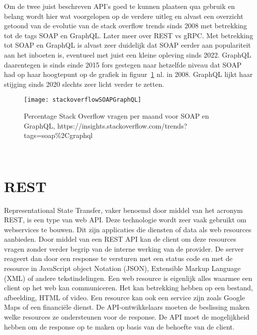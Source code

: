 Om de twee juist beschreven API's goed te kunnen plaatsen qua gebruik en belang wordt hier wat voorgelopen op de verdere uitleg en alvast een overzicht getoond van de evolutie van de
stack overflow trends sinds 2008 met betrekking tot de tags SOAP en GraphQL. Later meer over REST vs gRPC. Met betrekking tot SOAP en GraphQL is alvast zeer duidelijk dat SOAP eerder
aan populariteit aan het inboeten is, eventueel met juist een kleine opleving sinds 2022. GraphQL daarentegen is sinds einde 2015 fors gestegen naar hetzelfde niveau dat SOAP had
op haar hoogtepunt op de grafiek in figuur~\ref{fig:stackoverflowSOAPGraphQL} nl. in 2008. GraphQL lijkt haar stijging sinds 2020 slechts zeer licht verder te zetten.
\begin{figure}[ht]
    \centering
    \texttt{[image: stackoverflowSOAPGraphQL]}
    \caption{Percentage Stack Overflow vragen per maand voor SOAP en GraphQL,\newline
    https://insights.stackoverflow.com/trends?tags=soap\%2Cgraphql}
    \label{fig:stackoverflowSOAPGraphQL}
\end{figure}\\
\nocite{stackoverflowSOAPGraphQL}


\section{REST}

Representational State Transfer, vaker benoemd door middel van het acronym REST, is een type van web API. Deze technologie wordt zeer vaak gebruikt om webservices te bouwen.
Dit zijn applicaties die diensten of data als web resources aanbieden. Door middel van een REST API kan de client om deze resources vragen zonder verder
begrip van de interne werking van de provider. De server reageert dan door een response te versturen met een status code en met de resource in JavaScript object Notation (JSON),
Extensible Markup Language (XML) of andere tekstindelingen. Een web resource is eigenlijk alles waarmee een client op het web kan communiceren.
Het kan betrekking hebben op een bestand, afbeelding, HTML of video. Een resource kan ook een service zijn zoals Google Maps of een financi\"ele dienst.
De API-ontwikkelaars moeten de beslissing maken welke resources ze ondersteunen voor de response.
De API moet de mogelijkheid hebben om de response op te maken op basis van de behoefte van de client.\newline
~\autocite{uptrends,guru99-webservices}\\

